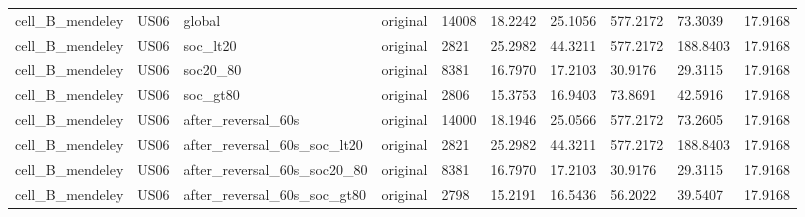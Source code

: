 \begin{tabular}{llllllllll}
cell\_B\_mendeley & US06 & global & original & 14008 & 18.2242 & 25.1056 & 577.2172 & 73.3039 & 17.9168 \\
cell\_B\_mendeley & US06 & soc\_lt20 & original & 2821 & 25.2982 & 44.3211 & 577.2172 & 188.8403 & 17.9168 \\
cell\_B\_mendeley & US06 & soc20\_80 & original & 8381 & 16.7970 & 17.2103 & 30.9176 & 29.3115 & 17.9168 \\
cell\_B\_mendeley & US06 & soc\_gt80 & original & 2806 & 15.3753 & 16.9403 & 73.8691 & 42.5916 & 17.9168 \\
cell\_B\_mendeley & US06 & after\_reversal\_60s & original & 14000 & 18.1946 & 25.0566 & 577.2172 & 73.2605 & 17.9168 \\
cell\_B\_mendeley & US06 & after\_reversal\_60s\_soc\_lt20 & original & 2821 & 25.2982 & 44.3211 & 577.2172 & 188.8403 & 17.9168 \\
cell\_B\_mendeley & US06 & after\_reversal\_60s\_soc20\_80 & original & 8381 & 16.7970 & 17.2103 & 30.9176 & 29.3115 & 17.9168 \\
cell\_B\_mendeley & US06 & after\_reversal\_60s\_soc\_gt80 & original & 2798 & 15.2191 & 16.5436 & 56.2022 & 39.5407 & 17.9168 \\
\hline
\end{tabular}
